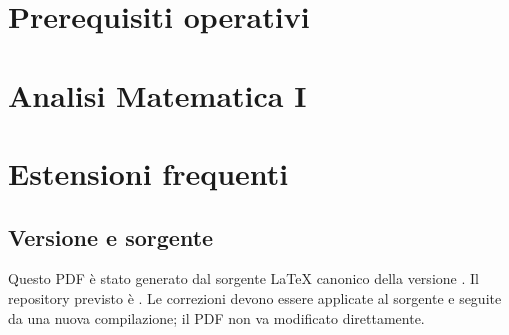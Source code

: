 \documentclass{ingegnerismo-formulario}
\begin{document}

\frontmatter


\tableofcontents
\cleardoublepage

\mainmatter
\part{Prerequisiti operativi}





\part{Analisi Matematica I}












\part{Estensioni frequenti}


\backmatter


\chapter*{Versione e sorgente}
Questo PDF è stato generato dal sorgente LaTeX canonico della versione \FormularioVersione. Il repository previsto è \href{\RepositoryURL}{\RepositoryURL}. Le correzioni devono essere applicate al sorgente e seguite da una nuova compilazione; il PDF non va modificato direttamente.
\end{document}
